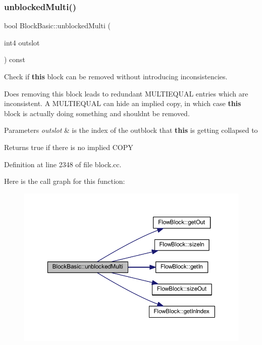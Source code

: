 \subsubsection{\texorpdfstring{unblockedMulti()}{unblockedMulti()}}
{\footnotesize\ttfamily bool Block\+Basic\+::unblocked\+Multi (\begin{DoxyParamCaption}\item[{int4}]{outslot }\end{DoxyParamCaption}) const}



Check if {\bfseries{this}} block can be removed without introducing inconsistencies. 

Does removing this block leads to redundant M\+U\+L\+T\+I\+E\+Q\+U\+AL entries which are inconsistent. A M\+U\+L\+T\+I\+E\+Q\+U\+AL can hide an implied copy, in which case {\bfseries{this}} block is actually doing something and shouldn\textquotesingle{}t be removed. 
\begin{DoxyParams}{Parameters}
{\em outslot} & is the index of the outblock that {\bfseries{this}} is getting collapsed to \\
\hline
\end{DoxyParams}
\begin{DoxyReturn}{Returns}
true if there is no implied C\+O\+PY 
\end{DoxyReturn}


Definition at line 2348 of file block.\+cc.

Here is the call graph for this function\+:
\nopagebreak
\begin{figure}[H]
\begin{center}
\leavevmode
\includegraphics[width=350pt]{class_block_basic_a71442a96a2278c3b88c8027f4b1444c9_cgraph}
\end{center}
\end{figure}


